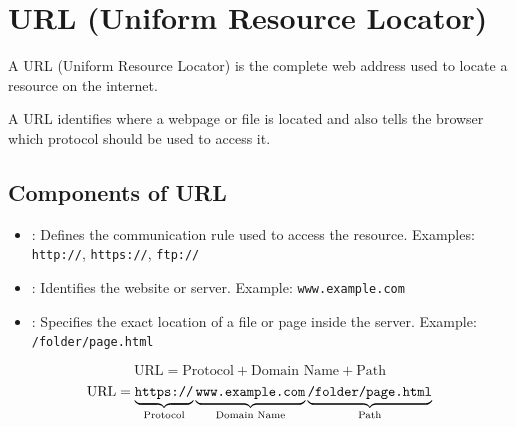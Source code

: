 \section{URL (Uniform Resource Locator)}

\begin{definitionbox}[URL]
A URL (Uniform Resource Locator) is the complete web address used to locate a resource on the internet.
\end{definitionbox}

\Note A URL identifies where a webpage or file is located and also tells the browser which protocol should be used to access it.

\subsection{Components of URL}

\begin{itemize}
    \item {}: Defines the communication rule used to access the resource. Examples: \texttt{http://}, \texttt{https://}, \texttt{ftp://}
    \item {}: Identifies the website or server. Example: \texttt{www.example.com}
    \item {}: Specifies the exact location of a file or page inside the server. Example: \texttt{/folder/page.html}
\end{itemize}

\begin{formulabox}
\[
\text{URL} = \text{Protocol} + \text{Domain Name} + \text{Path}
\]
\[
\text{URL}
=
\underbrace{\text{\texttt{https://}}}_{\text{Protocol}}
\underbrace{\text{\texttt{www.example.com}}}_{\text{Domain Name}}
\underbrace{\text{\texttt{/folder/page.html}}}_{\text{Path}}
\]
\end{formulabox}

